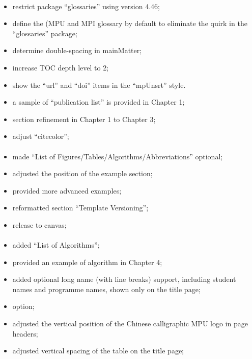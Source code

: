 \paragraph{}
	\begin{itemize}[noitemsep]
		\item restrict package ``glossaries'' using version 4.46;
		\item define the (\gls{MPU} and MPI glossary by default to eliminate the quirk in the ``glossaries'' package;
		\item determine double-spacing in mainMatter;
		\item increase TOC depth level to 2;
		\item show the ``url'' and ``doi'' items in the ``mpUnsrt'' style.
		\item a sample of ``publication list'' is provided in Chapter 1;
		\item section refinement in Chapter 1 to Chapter 3;
		\item adjust ``citecolor'';
	\end{itemize}

\paragraph{}
	\begin{itemize}[noitemsep]
		\item made ``List of Figures/Tables/Algorithms/Abbreviations'' optional;
		\item adjusted the position of the example section;
		\item provided more advanced examples;
		\item reformatted section ``Template Versioning'';
		\item release to canvas;
	\end{itemize}

\paragraph{}
	\begin{itemize}[noitemsep]
		\item added ``List of Algorithms'';
		\item provided an example of algorithm in Chapter 4;
		\item added optional long name (with line breaks) support, including student names and programme names, shown only on the title page;
		\item {} option;
		\item adjusted the vertical position of the Chinese calligraphic MPU logo in page headers;
		\item adjusted vertical spacing of the table on the title page;
	\end{itemize}

